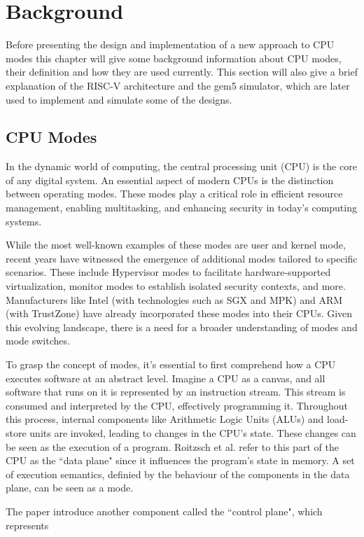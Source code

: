 \chapter{Background}

Before presenting the design and implementation of a new approach to CPU modes this chapter
will give some background information about CPU modes, their definition and how
they are used currently. This section will also give a brief explanation
of the RISC-V architecture and the gem5 simulator, which are later used to implement
and simulate some of the designs. 

\section{CPU Modes}
In the dynamic world of computing, the central processing unit (CPU) is the core
of any digital system. An essential aspect of modern CPUs is the distinction
between operating modes. These modes play a critical role in efficient resource
management, enabling multitasking, and enhancing security in today's computing
systems.\par
While the most well-known examples of these modes are user and kernel mode,
recent years have witnessed the emergence of additional modes tailored to
specific scenarios. These include Hypervisor modes to facilitate
hardware-supported virtualization, monitor modes to establish isolated security
contexts, and more. Manufacturers like Intel (with technologies such as SGX and
MPK) and ARM (with TrustZone) have already incorporated these modes into their
CPUs. Given this evolving landscape, there is a need for a broader understanding
of modes and mode switches.\par
To grasp the concept of modes, it's essential to first comprehend how a CPU
executes software at an abstract level. Imagine a CPU as a canvas, and all
software that runs on it is represented by an instruction stream. This stream is
consumed and interpreted by the CPU, effectively programming it. Throughout this
process, internal components like Arithmetic Logic Units (ALUs) and load-store
units are invoked, leading to changes in the CPU's state. These changes can be
seen as the execution of a program. Roitzsch et al.\cite{Roitzsch} refer to this part of the
CPU as the ``data plane" since it influences the program's state in memory.
A set of execution semantics, definied by the behaviour of the components in the
data plane, can be seen as a mode.\par
The paper introduce another component called the ``control plane", which represents
